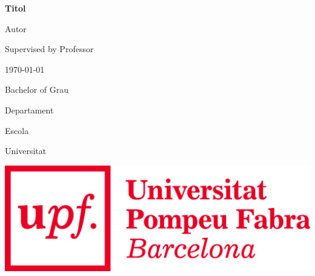 \def\title{Titol}
\def\autor{Autor}
\def\supervisor{Professor}
\def\bachelor{Grau}
\def\department{Departament}
\def\escola{Escola}
\def\uni{Universitat}



\begin{titlepage}

\begin{center}

\vspace{1.5cm}

{\LARGE \bfseries \title }

\vspace{1.5cm}

{\Large \autor }

\vspace{.5cm}

{\Large Supervised by \supervisor }

\vspace{3.5cm}

{\large \today}

\vspace{3.5cm}

{\Large Bachelor of \bachelor }

\vspace{0.5cm}

{\Large \department}

\vspace{0.5cm}

{\Large \escola}

\vspace{0.5cm}

{\Large \uni}

\vspace*{\fill}

\includegraphics[scale=0.4]{upf_word_imp.jpg}

\end{center}

\end{titlepage}


